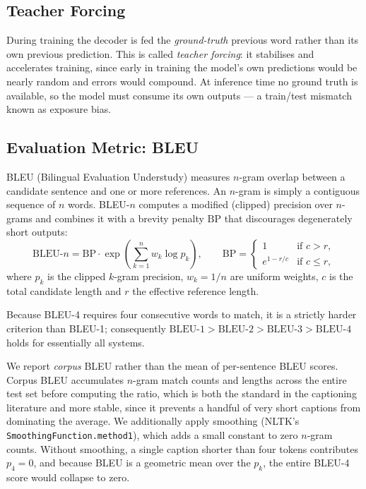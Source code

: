 \documentclass{article}
\begin{document}
\subsection{Teacher Forcing}

During training the decoder is fed the \emph{ground-truth} previous word rather
than its own previous prediction. This is called \emph{teacher forcing}: it
stabilises and accelerates training, since early in training the model's own
predictions would be nearly random and errors would compound. At inference time
no ground truth is available, so the model must consume its own outputs --- a
train/test mismatch known as exposure bias.

\subsection{Evaluation Metric: BLEU}

BLEU (Bilingual Evaluation Understudy) \citep{papineni2002bleu} measures
$n$-gram overlap between a candidate sentence and one or more references. An
$n$-gram is simply a contiguous sequence of $n$ words. BLEU-$n$ computes a
modified (clipped) precision over $n$-grams and combines it with a brevity
penalty $\mathrm{BP}$ that discourages degenerately short outputs:
\begin{equation}
  \mathrm{BLEU}\text{-}n = \mathrm{BP} \cdot
  \exp\!\left( \sum_{k=1}^{n} w_k \log p_k \right),
  \qquad
  \mathrm{BP} = \begin{cases}
    1 & \text{if } c > r,\\
    e^{1 - r/c} & \text{if } c \le r,
  \end{cases}
\end{equation}
where $p_k$ is the clipped $k$-gram precision, $w_k = 1/n$ are uniform weights,
$c$ is the total candidate length and $r$ the effective reference length.

Because BLEU-4 requires four consecutive words to match, it is a strictly harder
criterion than BLEU-1; consequently
$\mathrm{BLEU}\text{-}1 > \mathrm{BLEU}\text{-}2 > \mathrm{BLEU}\text{-}3 >
\mathrm{BLEU}\text{-}4$ holds for essentially all systems.

We report \emph{corpus} BLEU rather than the mean of per-sentence BLEU scores.
Corpus BLEU accumulates $n$-gram match counts and lengths across the entire test
set before computing the ratio, which is both the standard in the captioning
literature and more stable, since it prevents a handful of very short captions
from dominating the average. We additionally apply smoothing (NLTK's
\texttt{SmoothingFunction.method1}), which adds a small constant to zero $n$-gram
counts. Without smoothing, a single caption shorter than four tokens contributes
$p_4 = 0$, and because BLEU is a geometric mean over the $p_k$, the entire
BLEU-4 score would collapse to zero.
\end{document}

